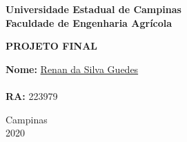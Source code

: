 \begin{titlepage}
	\begin{center}
		\begin{large}
			\textbf{Universidade Estadual de Campinas}\\\vspace{.5cm}
			\textbf{Faculdade de Engenharia Agrícola}\\\vspace{10.5cm}
		\end{large}
		\begin{large}
			\uppercase{\textbf{Projeto Final}}\\\vspace{4cm}
		\end{large}
	\end{center}
	\begin{large}
		\noindent\textbf{Nome:} \href{https://github.com/RenanSGuedes}{Renan da Silva Guedes}\\\\
		\noindent\textbf{RA:} 223979\\\vspace{5cm}
	\end{large}
	\begin{center}
		\begin{large}
			Campinas\\\vspace{.3cm}
			2020
		\end{large}
	\end{center}
\end{titlepage}